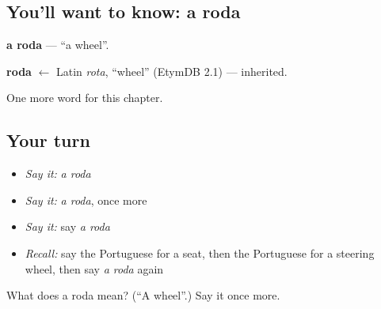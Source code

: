 \subsection*{You'll want to know: a roda}
\textbf{a roda} — \textquotedblleft{}a wheel\textquotedblright{}.

\begin{cousinweb}
\textbf{roda} $\leftarrow$ Latin \emph{rota}, \textquotedblleft{}wheel\textquotedblright{} (EtymDB 2.1) — inherited.
\end{cousinweb}

\begin{grammarlens}[title={What you've built}]
One more word for this chapter.
\end{grammarlens}

\subsection*{Your turn}
\begin{itemize}
\raggedright
  \item \emph{Say it:} \emph{a roda}
  \item \emph{Say it:} \emph{a roda}, once more
  \item \emph{Say it:} say \emph{a roda}
  \item \emph{Recall:} say the Portuguese for a seat, then the Portuguese for a steering wheel, then say \emph{a roda} again
\end{itemize}

\begin{tcolorbox}[breakable,colback=teal!4,colframe=teal!35!black,title={Before you move on}]
What does a roda mean? (\textquotedblleft{}A wheel\textquotedblright{}.) Say it once more.
\end{tcolorbox}
